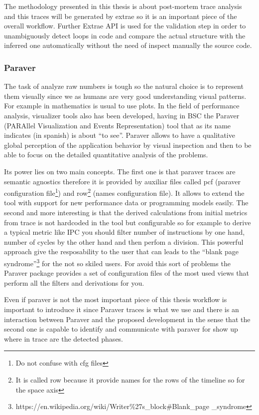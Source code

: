 The methodology presented in this thesis is about post-mortem trace analysis and
this traces will be generated by extrae so it is an important piece of the
overall workflow. Further Extrae API is used for the validation step in order to
unambiguously detect loops in code and compare the actual structure with the
inferred one automatically without the need of inspect manually the source code.

\subsubsection{Paraver}

The task of analyze raw numbers is tough so the natural choice is to represent 
them visually since we as humans are very
good understanding visual patterns. For example in mathematics
is usual to use plots. In the field of performance analysis, visualizer tools
also has been developed, having in BSC the Paraver (PARAllel Visualization and
Events Representation) tool that as its name indicates
(in spanish) is  about ``to see''. Paraver allows to have a qualitative global 
perception of the application behavior by visual inspection and then to be able 
to focus on the detailed quantitative analysis of the problems.

Its power lies on two main concepts. The first one is that paraver traces are
semantic agnostics therefore it is provided by auxiliar files called pcf (paraver
configuration file\footnote{Do not confuse with cfg files}) and row\footnote{It 
is called row because it provide names for the rows of the timeline so for the 
space axis} (names configuration file). It allows to extend the tool with
support for new performance data or programming models easily. The second and
more interesting is that the derived calculations from initial metrics from trace is
not hardcoded in the tool but configurable so for example to derive a typical
metric like IPC you should filter number of
instructions by one hand, number of cycles by the other hand and then perfom a
division. This powerful approach give the resposability to the user that can
leads to the ``blank page
syndrome''\footnote{https://en.wikipedia.org/wiki/Writer\%27s\_block\#Blank\_page
\_syndrome} for the not so skiled users. For avoid this
sort of problems the Paraver package provides a set of configuration files of
the most used views that perform all the filters and derivations for you.

Even if paraver is not the most important piece of this thesis workflow is
important to introduce it since Paraver traces is what we use and  there is an
interaction between Paraver and the proposed development in the sense that the
second one is capable to identify and communicate with paraver for show up where
in trace are the detected phases.

